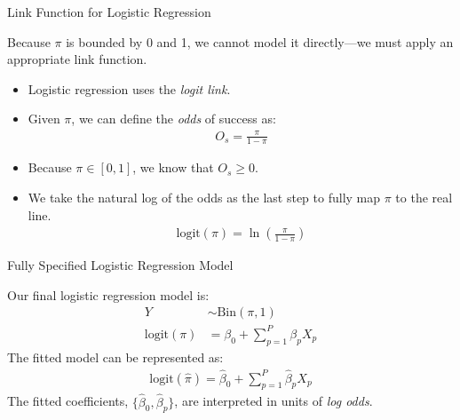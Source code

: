 \documentclass{beamer}\usepackage[]{graphicx}\usepackage[]{color}
\begin{document}

\begin{frame}{Link Function for Logistic Regression}
  
  Because $\pi$ is bounded by 0 and 1, we cannot model it directly---we must 
  apply an appropriate link function.
  \vc
  \begin{itemize}
  \item Logistic regression uses the \emph{logit link}.
    \vc
  \item Given $\pi$, we can define the \emph{odds} of success as:
    \begin{align*}
      O_s = \frac{\pi}{1 - \pi}
    \end{align*}
  \item Because $\pi \in [0, 1]$, we know that $O_s \geq 0$.
    \vc
  \item We take the natural log of the odds as the last step to fully map 
    $\pi$ to the real line.
    \begin{align*}
      \text{logit}(\pi) = \ln \left(\frac{\pi}{1 - \pi}\right)
    \end{align*}
  \end{itemize}
  
\end{frame}


\begin{frame}{Fully Specified Logistic Regression Model}
  
  Our final logistic regression model is:
  \begin{align*}
    Y &\sim \text{Bin}(\pi, 1)\\
    \text{logit}(\pi) &= \beta_0 + \sum_{p = 1}^P \beta_p X_p
  \end{align*}
  The fitted model can be represented as:
  \begin{align*}
    \text{logit}(\hat{\pi}) = \hat{\beta}_0 + \sum_{p = 1}^P \hat{\beta}_p X_p
  \end{align*}
  The fitted coefficients, $\{\hat{\beta}_0, \hat{\beta}_p\}$, are interpreted 
  in units of \emph{log odds}.

\end{frame}

\end{document}
